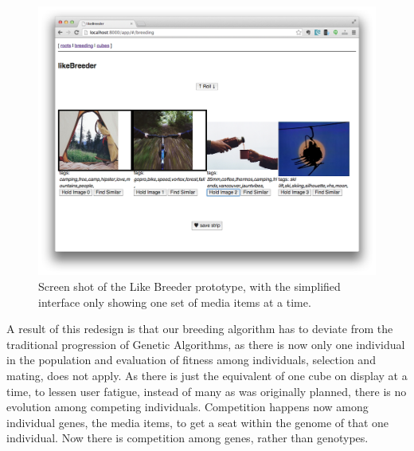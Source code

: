 \documentclass[]{article}
\begin{document}
\begin{figure}[htp]
	\centerline{\includegraphics[width=\textwidth]{breederPrototype2.png}}
	\caption{Screen shot of the Like Breeder prototype, with the simplified interface only showing one set of media items at a time.}
	\label{fig:likeBreeder}
\end{figure}

A result of this redesign is that our breeding algorithm has to deviate from the traditional progression of Genetic Algorithms, as there is now only one individual in the population and evaluation of fitness among individuals, selection and mating, does not apply.  As there is just the equivalent of one cube on display at a time, to lessen user fatigue, instead of many as was originally planned, there is no evolution among competing individuals.  Competition happens now among individual genes, the media items, to get a seat within the genome of that one individual.  Now there is competition among genes, rather than genotypes.


\end{document}
